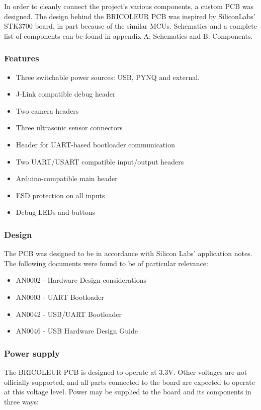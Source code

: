 In order to cleanly connect the project's various components, a custom PCB was designed. The design behind the BRICOLEUR PCB was inspired by SiliconLabs' STK3700 board, in part because of the similar MCUs. Schematics and a complete list of components can be found in appendix A: Schematics and B: Components.


\subsubsection{Features}
\begin{itemize}
    \item Three switchable power sources: USB, PYNQ and external.
    \item J-Link compatible debug header
    \item Two camera headers 
    \item Three ultrasonic sensor connectors
    \item Header for UART-based bootloader communication
    \item Two UART/USART compatible input/output headers
    \item Arduino-compatible main header
    \item ESD protection on all inputs
    \item Debug LEDs and buttons
\end{itemize}

\subsubsection{Design}
The PCB was designed to be in accordance with Silicon Labs' application notes. The following documents were found to be of particular relevance:
\begin{itemize}
    \item AN0002 - Hardware Design considerations
    \item AN0003 - UART Bootloader
    \item AN0042 - USB/UART Bootloader
    \item AN0046 - USB Hardware Design Guide
\end{itemize}

\subsubsection{Power supply}
The BRICOLEUR PCB is designed to operate at 3.3V. Other voltages are not officially supported, and all parts connected to the board are expected to operate at this voltage level. Power may be supplied to the board and its components in three ways: 

